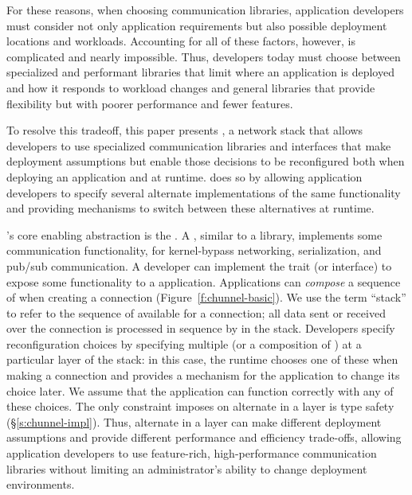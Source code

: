 For these reasons, when choosing communication libraries, application developers must consider not only application requirements but also possible deployment locations and workloads.
Accounting for all of these factors, however, is complicated and nearly impossible. Thus, developers today must choose between specialized and performant libraries that limit where an application is deployed and how it responds to workload changes and general libraries that provide flexibility but with poorer performance and fewer features.

To resolve this tradeoff, this paper presents \name,
a network stack that allows developers to use specialized communication libraries and interfaces that make deployment assumptions but enable those decisions to be reconfigured both when deploying an application and at runtime. 
\name does so by allowing application developers to specify several alternate implementations of the same functionality and providing mechanisms to switch between these alternatives at runtime.

\name's core enabling abstraction is the {\em \tunnel}.
A \tunnel, similar to a library, implements some communication functionality, \eg for kernel-bypass networking, serialization, and pub/sub communication.
A developer can implement the \tunnel trait (or interface) to expose some functionality to a \name application.
Applications can \emph{compose} a sequence of \tunnels when creating a connection (Figure~\ref{f:chunnel-basic}).
We use the term ``\tunnel stack'' to refer to the sequence of \tunnels available for a connection; all data sent or received over the connection is processed in sequence by \tunnels in the stack.
Developers specify reconfiguration choices by specifying multiple \tunnels (or a composition of \tunnels) at a particular layer of the stack: in this case, the \name runtime chooses one of these when making a connection and provides a mechanism for the application to change its choice later. We assume that the application can function correctly with any of these \tunnel choices. The only constraint \name imposes on alternate \tunnels in a layer is type safety (\S\ref{s:chunnel-impl}). 
Thus, alternate \tunnels in a layer can make different deployment assumptions and provide different performance and efficiency trade-offs,  allowing application developers to use feature-rich, high-performance communication libraries without limiting an administrator's ability to change deployment environments.

